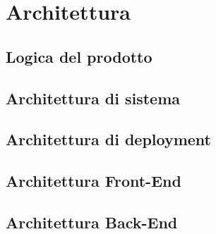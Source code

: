 

\section{Architettura}
\label{sec:tecnologie_coinvolte}

\subsection{Logica del prodotto}


\subsection{Architettura di sistema}


\subsection{Architettura di deployment}


\subsection{Architettura Front-End}


\subsection{Architettura Back-End}

